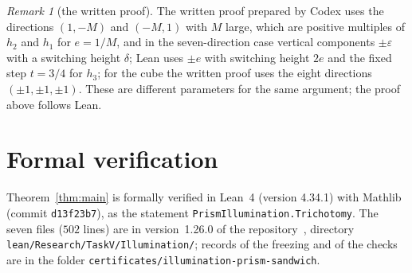 \documentclass[11pt]{article}
\theoremstyle{definition}
\theoremstyle{remark}
\newtheorem{remark}{Remark}
\newcommand{\repoversion}{1.26.0}
\begin{document}
\begin{remark}[the written proof]\label{rem:written}
The written proof prepared by Codex uses the directions $(1,-M)$ and $(-M,1)$
with $M$ large, which are positive multiples of $h_2$ and $h_1$ for $e=1/M$,
and in the seven-direction case vertical components $\pm\varepsilon$ with a
switching height $\delta$; Lean uses $\pm e$ with switching height $2e$ and the
fixed step $t=3/4$ for $h_3$; for the cube the written proof uses the eight
directions $(\pm1,\pm1,\pm1)$. These are different parameters for the same
argument; the proof above follows Lean.
\end{remark}

{\sloppy
\section{Formal verification}\label{sec:lean}

Theorem~\ref{thm:main} is formally verified in Lean~4 (version 4.34.1) with
Mathlib~\cite{mathlib} (commit \texttt{d13f23b7}), as the statement
\texttt{PrismIllumination.Trichotomy}. The seven files ($502$ lines) are in
version~\repoversion{} of the repository~\cite{repo}, directory
\texttt{lean/Research/TaskV/Illumination/}; records of the freezing and of the
checks are in the folder \texttt{certificates/illumination-prism-sandwich}.

}
\end{document}

